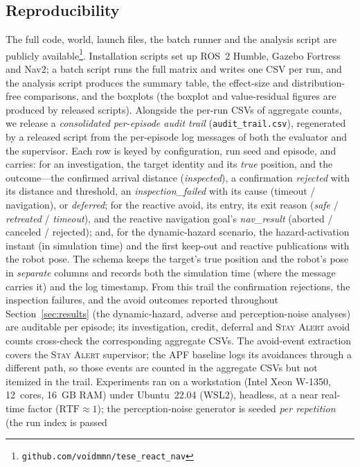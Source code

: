 \subsection{Reproducibility}
\label{sec:setup-repro}
The full code, world, launch files, the batch runner and the analysis script
are publicly available\footnote{\texttt{github.com/voidmmn/tese\_react\_nav}}.
Installation scripts set up ROS~2
Humble, Gazebo Fortress and Nav2; a batch script runs the full matrix
and writes one CSV per run, and the analysis script produces the summary table,
the effect-size and distribution-free comparisons, and the boxplots (the boxplot
and value-residual figures are produced by released scripts). Alongside the
per-run CSVs of aggregate counts, we release a \emph{consolidated per-episode
audit trail} (\texttt{audit\_trail.csv}), regenerated by a released script from the
per-episode log messages of both the evaluator and the supervisor. Each row is
keyed by configuration, run seed and episode, and carries: for an investigation,
the target identity and its \emph{true} position, and the outcome---the confirmed
arrival distance (\emph{inspected}), a confirmation \emph{rejected} with its
distance and threshold, an \emph{inspection\_failed} with its cause
(timeout / navigation), or \emph{deferred}; for the reactive avoid, its entry, its
exit reason (\emph{safe} / \emph{retreated} / \emph{timeout}), and the reactive
navigation goal's \emph{nav\_result} (aborted / canceled / rejected); and, for the
dynamic-hazard scenario, the hazard-activation instant (in simulation time) and the
first keep-out and reactive publications with the robot pose. The schema keeps the
target's true position and the robot's pose in \emph{separate} columns and records
both the simulation time (where the message carries it) and the log timestamp.
From this trail the confirmation rejections, the inspection failures, and the avoid
outcomes reported throughout Section~\ref{sec:results} (the dynamic-hazard,
adverse and perception-noise analyses) are auditable per episode; its
investigation, credit, deferral and \textsc{Stay Alert} avoid counts cross-check
the corresponding aggregate CSVs. The avoid-event extraction covers the
\textsc{Stay Alert} supervisor; the APF baseline logs its avoidances through a
different path, so those events are counted in the aggregate CSVs but not itemized
in the trail. Experiments
ran on a workstation (Intel Xeon W-1350, 12~cores, 16~GB RAM) under Ubuntu~22.04
(WSL2), headless, at a near real-time factor ($\mathrm{RTF}\approx1$); the
perception-noise generator is seeded \emph{per repetition} (the run index is passed
